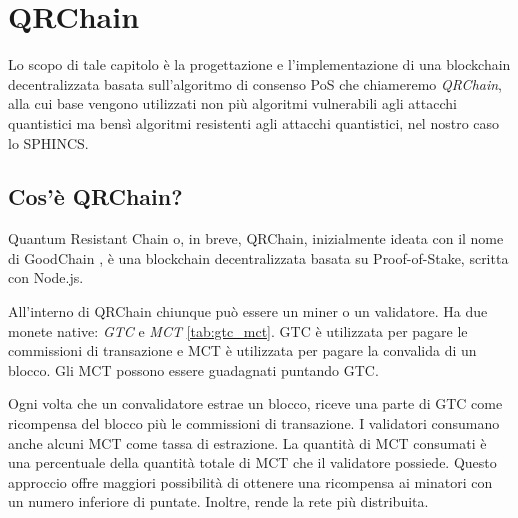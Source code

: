 \chapter{QRChain}
Lo scopo di tale capitolo è la progettazione e l'implementazione di una blockchain decentralizzata basata sull'algoritmo di consenso PoS che chiameremo \textit{QRChain}, alla cui base vengono utilizzati non più algoritmi vulnerabili agli attacchi quantistici ma bensì algoritmi resistenti agli attacchi quantistici, nel nostro caso lo SPHINCS.

\section{Cos'è QRChain?}
Quantum Resistant Chain o, in breve, QRChain, inizialmente ideata con il nome di GoodChain \cite{Ghorbanzadeh_GoodChain_2022}, è una blockchain decentralizzata basata su Proof-of-Stake, scritta con Node.js.

All'interno di QRChain chiunque può essere un miner o un validatore. Ha due monete native: \textit{GTC} e \textit{MCT} \ref{tab:gtc_mct}. GTC è utilizzata per pagare le commissioni di transazione e MCT è utilizzata per pagare la convalida di un blocco. Gli MCT possono essere guadagnati puntando GTC.

\begin{table}[]
  \caption{GTC e MCT}
  \label{tab:gtc_mct}
\end{table}

Ogni volta che un convalidatore estrae un blocco, riceve una parte di GTC come ricompensa del blocco più le commissioni di transazione.
I validatori consumano anche alcuni MCT come tassa di estrazione. La quantità di MCT consumati è una percentuale della quantità totale di MCT che il validatore possiede.
Questo approccio offre maggiori possibilità di ottenere una ricompensa ai minatori con un numero inferiore di puntate. Inoltre, rende la rete più distribuita.

